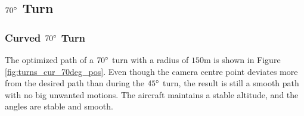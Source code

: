 \subsection{$70\degree$ Turn}

\subsubsection{Curved $70\degree$ Turn}

The optimized path of a $70\degree$ turn with a radius of $150$m is shown in Figure \ref{fig:turns_cur_70deg_pos}. Even though the camera centre point deviates more from the desired path than during the $45\degree$ turn, the result is still a smooth path with no big unwanted motions. The aircraft maintains a stable altitude, and the angles are stable and smooth.

